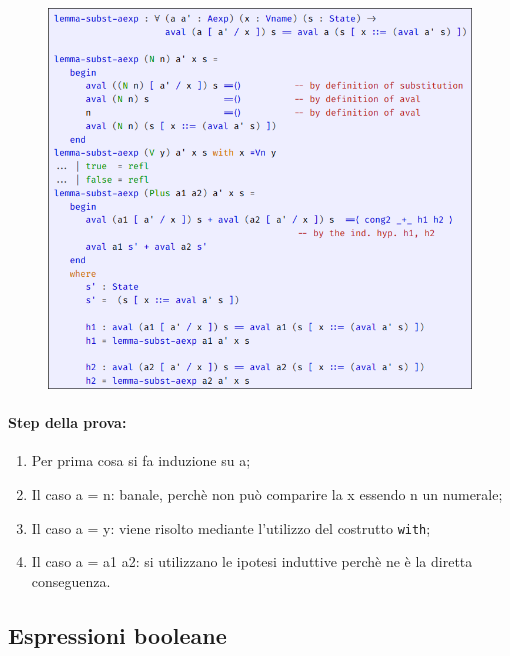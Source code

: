 \begin{figure}[h]
  \centering
  \includegraphics[scale=0.5]{images/IMP/Lsub.png}
\end{figure}

\paragraph{Step della prova:}

\begin{enumerate}
  \item Per prima cosa si fa induzione su a;
  \item Il caso a =  n: banale, perchè non può comparire la x essendo n un numerale;
  \item Il caso a =  y: viene risolto mediante l'utilizzo del costrutto \texttt{with};
  \item Il caso a =  a1 a2: si utilizzano le ipotesi induttive perchè ne è la diretta conseguenza.
\end{enumerate}

\subsection{Espressioni booleane}

